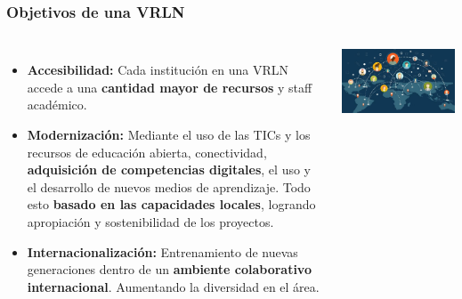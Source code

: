 \begin{frame}[fragile]
\frametitle{Objetivos de una VRLN}
\begin{columns}[c] %

\begin{itemize}
\item {\bf Accesibilidad:}
Cada institución en una VRLN accede a una {\bf \color{LCredInst}cantidad mayor de recursos} y staff académico.

\item {\bf Modernización:}
Mediante el uso de las TICs y los recursos de educación abierta, conectividad, {\bf \color{LCredInst}adquisición de competencias digitales}, el uso y el desarrollo de nuevos medios de aprendizaje. Todo esto {\bf \color{LCblueInst}basado en las capacidades locales}, logrando apropiación y sostenibilidad de los proyectos.

\item {\bf Internacionalización:}
Entrenamiento de nuevas generaciones dentro de un {\bf \color{logoyellow}ambiente colaborativo internacional}.
Aumentando la diversidad en el área.

\end{itemize}


\begin{center}
\includegraphics[scale=0.18]{imagenes/vrln.png}
\end{center}
\end{columns}
\end{frame}

